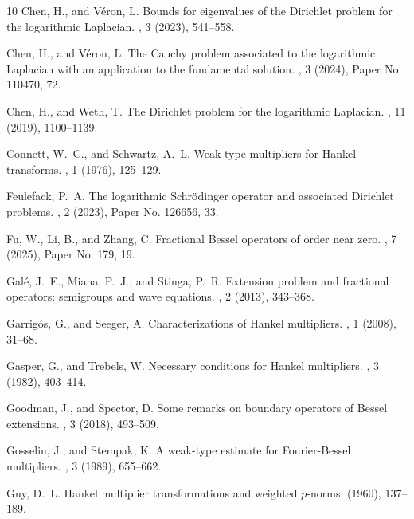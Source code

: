 \documentclass[a4paper,10pt, reqno]{amsart}
\theoremstyle{definition}
\theoremstyle{remark}
\numberwithin{equation}{section}
\begin{document}
\begin{thebibliography}{10}
{\sc Chen, H., and V\'eron, L.}
\newblock Bounds for eigenvalues of the {D}irichlet problem for the logarithmic {L}aplacian.
, 3 (2023), 541--558.

{\sc Chen, H., and V\'eron, L.}
\newblock The {C}auchy problem associated to the logarithmic {L}aplacian with an application to the fundamental solution.
, 3 (2024), Paper No. 110470, 72.

{\sc Chen, H., and Weth, T.}
\newblock The {D}irichlet problem for the logarithmic {L}aplacian.
, 11 (2019), 1100--1139.

{\sc Connett, W.~C., and Schwartz, A.~L.}
\newblock Weak type multipliers for {H}ankel transforms.
, 1 (1976), 125--129.

{\sc Feulefack, P.~A.}
\newblock The logarithmic {S}chr\"odinger operator and associated {D}irichlet problems.
, 2 (2023), Paper No. 126656, 33.

{\sc Fu, W., Li, B., and Zhang, C.}
\newblock Fractional {B}essel operators of order near zero.
, 7 (2025), Paper No. 179, 19.

{\sc Gal\'e, J.~E., Miana, P.~J., and Stinga, P.~R.}
\newblock Extension problem and fractional operators: semigroups and wave equations.
, 2 (2013), 343--368.

{\sc Garrig\'os, G., and Seeger, A.}
\newblock Characterizations of {H}ankel multipliers.
, 1 (2008), 31--68.

{\sc Gasper, G., and Trebels, W.}
\newblock Necessary conditions for {H}ankel multipliers.
, 3 (1982), 403--414.

{\sc Goodman, J., and Spector, D.}
\newblock Some remarks on boundary operators of {B}essel extensions.
, 3 (2018), 493--509.

{\sc Gosselin, J., and Stempak, K.}
\newblock A weak-type estimate for {F}ourier-{B}essel multipliers.
, 3 (1989), 655--662.

{\sc Guy, D.~L.}
\newblock Hankel multiplier transformations and weighted {$p$}-norms.
 (1960), 137--189.


\end{thebibliography}
\end{document}
